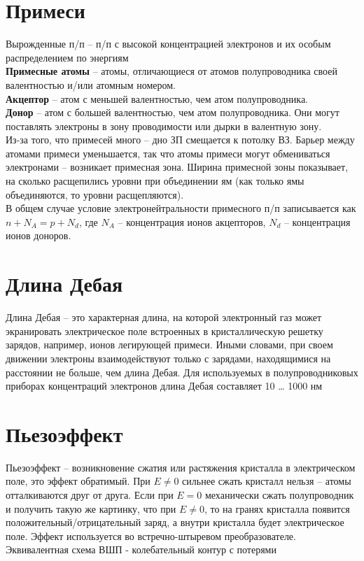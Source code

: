\begin{multicols*}{2}
		\section{Примеси}
		Вырожденные п/п – п/п с высокой концентрацией электронов и их особым распределением по энергиям\\
		\textbf{Примесные атомы} – атомы, отличающиеся от атомов полупроводника своей валентностью и/или атомным номером.\\
		\textbf{Акцептор} – атом с меньшей валентностью, чем атом полупроводника.\\
		\textbf{Донор} – атом с большей валентностью, чем атом полупроводника. Они могут поставлять электроны в зону проводимости или дырки в валентную зону.\\
		Из-за того, что примесей много – дно ЗП смещается к потолку ВЗ. Барьер между атомами примеси уменьшается, так что атомы примеси могут обмениваться электронами – возникает примесная зона. Ширина примесной зоны показывает, на сколько расщепились уровни при объединении ям (как только ямы объединяются, то уровни расщепляются).\\
		В общем случае условие электронейтральности примесного п/п записывается как $n + N_A = p + N_d$, где $N_A$ – концентрация ионов акцепторов, $N_d$ – концентрация ионов доноров.

		\section{Длина Дебая}
		Длина Дебая – это характерная длина, на которой электронный газ может экранировать электрическое поле встроенных в кристаллическую решетку зарядов, например, ионов легирующей примеси. Иными словами, при своем движении электроны взаимодействуют только с зарядами, находящимися на расстоянии не больше, чем длина Дебая. Для используемых в полупроводниковых приборах концентраций электронов длина Дебая составляет 10 … 1000 нм

		\section{Пьезоэффект}
		Пьезоэффект – возникновение сжатия или растяжения кристалла в электрическом поле, это эффект обратимый. При $E\neq 0$ сильнее сжать кристалл нельзя – атомы отталкиваются друг от друга. Если при $E = 0$ механически сжать полупроводник и получить такую же картинку, что при $E\neq 0$, то на гранях кристалла появится положительный/отрицательный заряд, а внутри кристалла будет электрическое поле. Эффект используется во встречно-штыревом преобразователе. Эквивалентная схема ВШП - колебательный контур с потерями


\end{multicols*}
